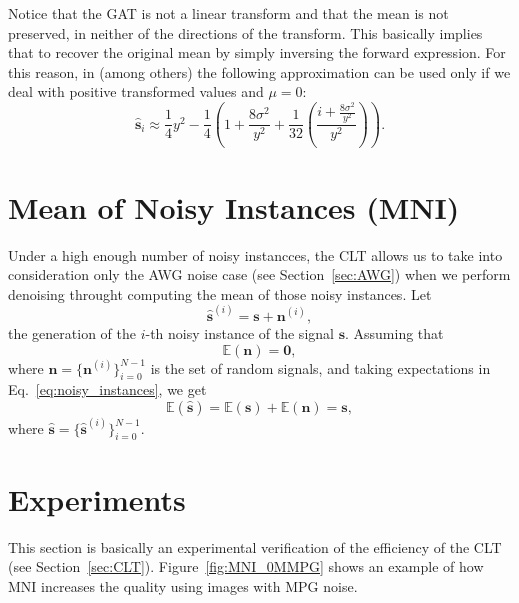Notice that the \gls{GAT} is not a linear transform and that the mean is
not preserved, in neither of the directions of the transform. This
basically implies that to recover the original mean by simply
inversing the forward expression. For this reason, in
\cite{makitalo2012optimal} (among others) the following approximation
can be used only if we deal with positive transformed values and $\mu=0$:
\begin{equation}
  \hat{\mathbf{s}}_i \approx \frac{1}{4}y^2-\frac{1}{4}\left(1+\frac{8\sigma^2}{y^2} + \frac{1}{32}\left(\frac{i+\frac{8\sigma^2}{y^2}}{y^2}\right)\right).
\end{equation}

\section{Mean of Noisy Instances (MNI)}
Under a high enough number of noisy instancces, the \gls{CLT} allows
us to take into consideration only the \gls{AWG} noise case (see
Section~\ref{sec:AWG}) when we perform denoising throught computing
the mean of those noisy instances. Let
\begin{equation}
  \hat{\mathbf{s}}^{(i)} = \mathbf{s} + \mathbf{n}^{(i)},
  \label{eq:noisy_instances}
\end{equation}
the generation of the $i$-th noisy instance of the
signal $\mathbf{s}$. Assuming that
\begin{equation}
  \mathbb{E}(\mathbf{n})=\mathbf{0},
\end{equation}
where $\mathbf{n}=\{\mathbf{n}^{(i)}\}_{i=0}^{N-1}$ is the set of
random signals, and taking expectations in
Eq.~\ref{eq:noisy_instances}, we get
\begin{equation}
  \mathbb{E}(\hat{\mathbf{s}}) = \mathbb{E}(\mathbf{s}) + \mathbb{E}(\mathbf{n}) = \mathbf{s},
\end{equation}
where $\hat{\mathbf{s}}=\{\hat{\mathbf{s}}^{(i)}\}_{i=0}^{N-1}$.

\section{Experiments}

This section is basically an experimental verification of the
efficiency of the \gls{CLT} (see
Section~\ref{sec:CLT}). Figure~\ref{fig:MNI_0MMPG} shows an example of
how \gls{MNI} increases the quality using images with \gls{MPG} noise.
  
